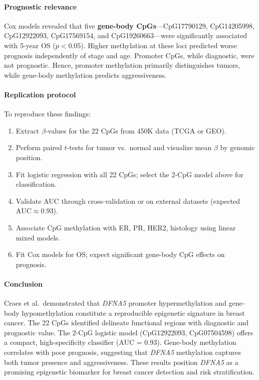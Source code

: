 \documentclass[10pt]{extarticle}
\begin{document}
\paragraph{Prognostic relevance}
Cox models revealed that five \textbf{gene-body CpGs}—CpG17790129, CpG14205998, CpG12922093, CpG17569154, and CpG19260663—were significantly associated with 5-year OS ($p<0.05$). Higher methylation at these loci predicted worse prognosis independently of stage and age. Promoter CpGs, while diagnostic, were not prognostic. Hence, promoter methylation primarily distinguishes tumors, while gene-body methylation predicts aggressiveness.

\paragraph{Replication protocol}
To reproduce these findings:
\begin{enumerate}
\item Extract $\beta$-values for the 22 CpGs from 450K data (TCGA or GEO).
\item Perform paired $t$-tests for tumor vs.\ normal and visualize mean $\beta$ by genomic position.
\item Fit logistic regression with all 22 CpGs; select the 2-CpG model above for classification.
\item Validate AUC through cross-validation or on external datasets (expected $\text{AUC}\approx0.93$).
\item Associate CpG methylation with ER, PR, HER2, histology using linear mixed models.
\item Fit Cox models for OS; expect significant gene-body CpG effects on prognosis.
\end{enumerate}

\paragraph{Conclusion}
Croes et al.\ demonstrated that \textit{DFNA5} promoter hypermethylation and gene-body hypomethylation constitute a reproducible epigenetic signature in breast cancer. The 22 CpGs identified delineate functional regions with diagnostic and prognostic value. The 2-CpG logistic model (CpG12922093, CpG07504598) offers a compact, high-specificity classifier (AUC = 0.93). Gene-body methylation correlates with poor prognosis, suggesting that \textit{DFNA5} methylation captures both tumor presence and aggressiveness. These results position \textit{DFNA5} as a promising epigenetic biomarker for breast cancer detection and risk stratification.
\end{document}
